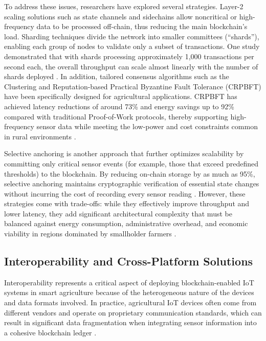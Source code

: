 \documentclass[12pt,onecolumn]{IEEEtran} %
\begin{document}
To address these issues, researchers have explored several strategies. Layer-2 scaling solutions such as state channels and sidechains allow noncritical or high-frequency data to be processed off-chain, thus reducing the main blockchain's load. Sharding techniques divide the network into smaller committees (``shards''), enabling each group of nodes to validate only a subset of transactions. One study demonstrated that with shards processing approximately 1,000 transactions per second each, the overall throughput can scale almost linearly with the number of shards deployed \cite{huang2025digitaltraceabilityin, abdurrohim2024blockchainbasedframeworkfor}. In addition, tailored consensus algorithms such as the Clustering and Reputation-based Practical Byzantine Fault Tolerance (CRPBFT) have been specifically designed for agricultural applications. CRPBFT has achieved latency reductions of around 73\% and energy savings up to 92\% compared with traditional Proof-of-Work protocols, thereby supporting high-frequency sensor data while meeting the low-power and cost constraints common in rural environments \cite{thiruvenkatasamy2025anonlinetool, huang2025digitaltraceabilityin}.

Selective anchoring is another approach that further optimizes scalability by committing only critical sensor events (for example, those that exceed predefined thresholds) to the blockchain. By reducing on-chain storage by as much as 95\%, selective anchoring maintains cryptographic verification of essential state changes without incurring the cost of recording every sensor reading \cite{huang2025digitaltraceabilityin, irfan2025aniotdrivensmart}. However, these strategies come with trade-offs: while they effectively improve throughput and lower latency, they add significant architectural complexity that must be balanced against energy consumption, administrative overhead, and economic viability in regions dominated by smallholder farmers \cite{huang2025digitaltraceabilityin, irfan2025aniotdrivensmart}.
  \subsection{Interoperability and Cross-Platform Solutions}\label{subsec:interoperability}
Interoperability represents a critical aspect of deploying blockchain-enabled IoT systems in smart agriculture because of the heterogeneous nature of the devices and data formats involved. In practice, agricultural IoT devices often come from different vendors and operate on proprietary communication standards, which can result in significant data fragmentation when integrating sensor information into a cohesive blockchain ledger \cite{irfan2025aniotdrivensmart, aliyu2023blockchainbasedsmartfarm}.
\end{document}
